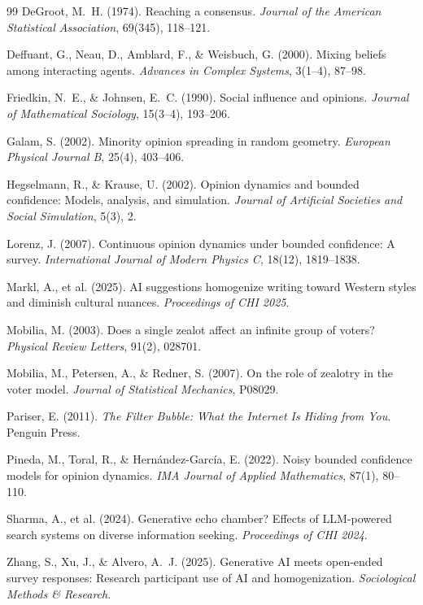 \documentclass{article}
\theoremstyle{plain}
\theoremstyle{definition}
\theoremstyle{remark}
\begin{document}
\begin{thebibliography}{99}
DeGroot, M.~H. (1974).
Reaching a consensus.
\textit{Journal of the American Statistical Association}, 69(345), 118--121.

Deffuant, G., Neau, D., Amblard, F., \& Weisbuch, G. (2000).
Mixing beliefs among interacting agents.
\textit{Advances in Complex Systems}, 3(1--4), 87--98.

Friedkin, N.~E., \& Johnsen, E.~C. (1990).
Social influence and opinions.
\textit{Journal of Mathematical Sociology}, 15(3--4), 193--206.

Galam, S. (2002).
Minority opinion spreading in random geometry.
\textit{European Physical Journal B}, 25(4), 403--406.

Hegselmann, R., \& Krause, U. (2002).
Opinion dynamics and bounded confidence: Models, analysis, and simulation.
\textit{Journal of Artificial Societies and Social Simulation}, 5(3), 2.

Lorenz, J. (2007).
Continuous opinion dynamics under bounded confidence: A survey.
\textit{International Journal of Modern Physics C}, 18(12), 1819--1838.

Markl, A., et al. (2025).
AI suggestions homogenize writing toward Western styles and diminish cultural nuances.
\textit{Proceedings of CHI 2025}.

Mobilia, M. (2003).
Does a single zealot affect an infinite group of voters?
\textit{Physical Review Letters}, 91(2), 028701.

Mobilia, M., Petersen, A., \& Redner, S. (2007).
On the role of zealotry in the voter model.
\textit{Journal of Statistical Mechanics}, P08029.

Pariser, E. (2011).
\textit{The Filter Bubble: What the Internet Is Hiding from You}.
Penguin Press.

Pineda, M., Toral, R., \& Hern\'{a}ndez-Garc\'{i}a, E. (2022).
Noisy bounded confidence models for opinion dynamics.
\textit{IMA Journal of Applied Mathematics}, 87(1), 80--110.

Sharma, A., et al. (2024).
Generative echo chamber? Effects of LLM-powered search systems on diverse information seeking.
\textit{Proceedings of CHI 2024}.

Zhang, S., Xu, J., \& Alvero, A.~J. (2025).
Generative AI meets open-ended survey responses: Research participant use of AI and homogenization.
\textit{Sociological Methods \& Research}.

\end{thebibliography}
\end{document}
